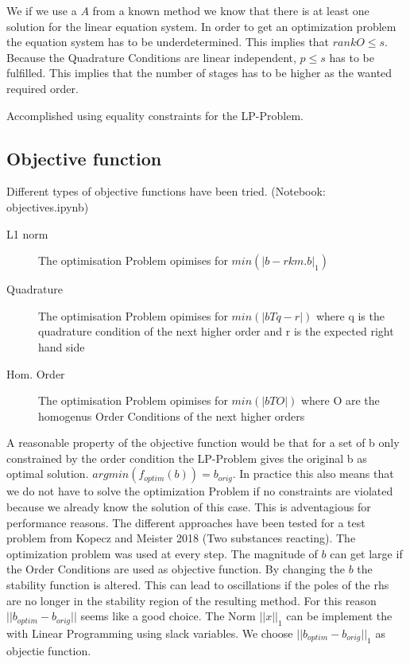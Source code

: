 \documentclass{article}
\begin{document}
We if we use a $A$ from a known method we know that there is at least one solution for the linear equation system.
In order to get an optimization problem the equation system has to be underdetermined.
This implies that $rank{O} \leq s$. 
Because the Quadrature Conditions are linear independent, $p \leq s$ has to be fulfilled.
This implies that the number of stages has to be higher as the wanted required order.

Accomplished using equality constraints for the LP-Problem.


\subsection{Objective function}
Different types of objective functions have been tried. (Notebook: objectives.ipynb)

\begin{description}

\item[L1 norm] The optimisation Problem opimises for $min(|b-rkm.b|_1)$
            
\item[Quadrature]   The optimisation Problem opimises for $min(|bTq-r|)$
                            where q is the quadrature condition of the next higher order 
                            and r is the expected right hand side
            
\item[Hom. Order]    The optimisation Problem opimises for $min(|bTO|)$ where O are the homogenus Order Conditions of the next higher orders
                            
 
\end{description}

A reasonable property of the objective function would be that for a set of b only constrained by the order condition the LP-Problem gives the original b as optimal solution.  $argmin(f_{optim}(b)) = b_{orig}$. In practice this also means that we do not have to solve the optimization Problem if no constraints are violated because we already know the solution of this case. This is adventagious for performance reasons.
The different approaches have been tested for a test problem from Kopecz and Meister 2018 (Two substances reacting). The optimization problem was used at every step.
The magnitude of $b$ can get large if the Order Conditions are used as objective function.
By changing the $b$ the stability function is altered. This can lead to oscillations if the poles of the rhs are no longer in the stability region of the resulting method.
For this reason $||b_{optim}-b_{orig}||$ seems like a good choice. The Norm $||x||_1$ can be implement the with Linear Programming using slack variables. We choose $||b_{optim}-b_{orig}||_1$ as objectie function.
\end{document}
